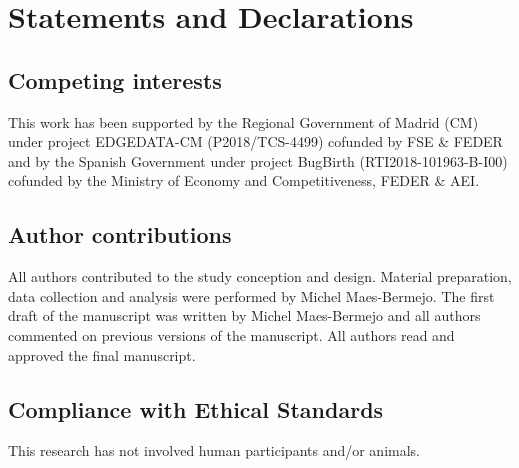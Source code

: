 \documentclass[smallextended]{svjour3}       %
\begin{document}
\section*{Statements and Declarations}
\label{sec:buildability:declarations}


\subsection*{Competing interests}

This work has been supported by the Regional Government of Madrid (CM) under project EDGEDATA-CM (P2018/TCS-4499) cofunded by FSE \& FEDER and by the Spanish Government under project BugBirth (RTI2018-101963-B-I00) cofunded by the Ministry of Economy and Competitiveness, FEDER \& AEI.


\subsection*{Author contributions}

All authors contributed to the study conception and design. Material preparation, data collection and analysis were performed by Michel Maes-Bermejo. The first draft of the manuscript was written by Michel Maes-Bermejo and all authors commented on previous versions of the manuscript. All authors read and approved the final manuscript.


\subsection*{Compliance with Ethical Standards}

This research has not involved human participants and/or animals.





\end{document}
